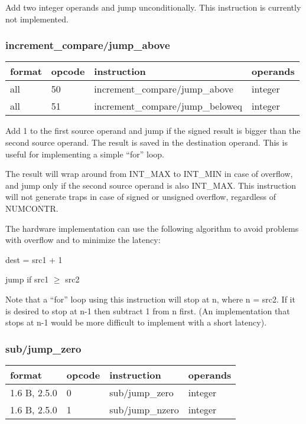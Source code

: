 \documentclass[forwardcom.tex]{subfiles}
\begin{document}
Add two integer operands and jump unconditionally. This instruction is currently not implemented.

\subsubsection{increment\_compare/jump\_above}
\label{table:addJumpInstruction}
\begin{tabular}{|p{16mm}|p{12mm}|p{60mm}|p{50mm}|}
\hline
\bfseries format & \bfseries opcode & \bfseries instruction & \bfseries operands \\ \hline
all & 50 & increment\_compare/jump\_above & integer \\ \hline
all & 51 & increment\_compare/jump\_beloweq & integer \\ \hline
\end{tabular}
\vspace{2mm}

Add 1 to the first source operand and jump if the signed result is bigger than the second source operand. The result is saved in the destination operand. This is useful for implementing a simple ``for'' loop.
\vspace{2mm}

The result will wrap around from INT\_MAX to INT\_MIN in case of overflow, and jump only if the second source operand is also INT\_MAX. This instruction will not generate traps in case of signed or unsigned overflow, regardless of NUMCONTR.
\vspace{2mm}

\vspace{2mm}

The hardware implementation can use the following algorithm to avoid problems with overflow and to minimize the latency:

dest = src1 + 1

jump if src1 $\geq$ src2
\vspace{2mm}

Note that a ``for'' loop using this instruction will stop at n, where n = src2. If it is desired to stop at n-1 then subtract 1 from n first. (An implementation that stops at n-1 would be more difficult to implement with a short latency).

\subsubsection{sub/jump\_zero}
\label{table:subJumpZeroInstruction}
\begin{tabular}{|p{20mm}|p{12mm}|p{56mm}|p{50mm}|}
\hline
\bfseries format & \bfseries opcode & \bfseries instruction & \bfseries operands \\ \hline
1.6 B, 2.5.0 &  0 & sub/jump\_zero & integer \\ \hline
1.6 B, 2.5.0 &  1 & sub/jump\_nzero  & integer\\ \hline
\end{tabular}
\vspace{2mm}
\end{document}
